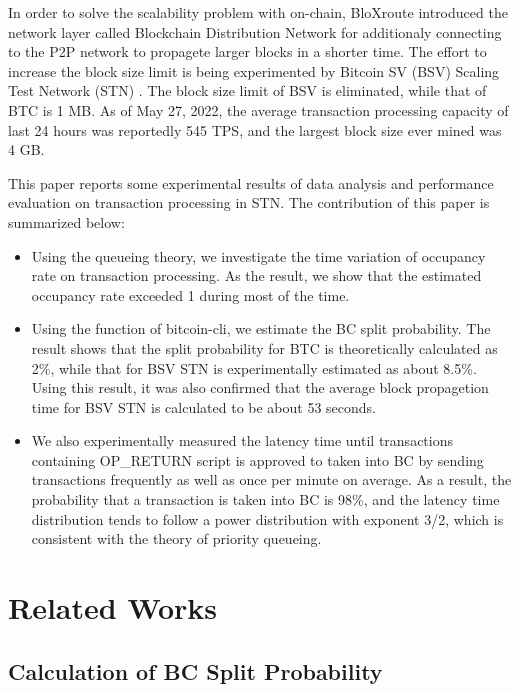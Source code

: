 \documentclass[graybox]{svmult}
\begin{document}
In order to solve the scalability problem with on-chain, 
BloXroute\cite{bloX} introduced the network layer called Blockchain Distribution Network for additionaly connecting to the P2P network to propagete larger blocks in a shorter time. 
The effort to increase the block size limit is being experimented by Bitcoin SV (BSV) \cite{bsv} Scaling Test Network (STN) \cite{bitcoinscaling}.
The block size limit of BSV is eliminated, while that of BTC is 1 MB. 
As of May 27, 2022, the average transaction processing capacity of last 24 hours was reportedly 545 TPS, and the largest block size ever mined was 4 GB. 


This paper reports some experimental results of data analysis and performance evaluation on transaction processing in STN. 
The contribution of this paper is summarized below: 
%
\begin{itemize}
  \item Using the queueing theory, we investigate the time variation of occupancy rate on transaction processing. 
	As the result, we show that the estimated occupancy rate exceeded 1 during most of the time. 
  \item Using the function of bitcoin-cli, we estimate the BC split probability. 
	The result shows that the split probability for BTC is theoretically calculated as 2\%, while that for BSV STN is experimentally estimated as about 8.5\%.
	Using this result, it was also confirmed that the average block propagetion time for BSV STN is calculated to be about 53 seconds. 
  \item We also experimentally measured the latency time until transactions containing OP\_RETURN script is approved to taken into BC by sending transactions frequently as well as once per minute on average. 
	As a result, the probability that a transaction is taken into BC is 98\%, and the latency time distribution tends to follow a power distribution with exponent 3/2, which is consistent with the theory of priority queueing. 
\end{itemize}
%




\section{Related Works}
\label{sec:rworks}

\subsection{Calculation of BC Split Probability}
\label{sec:fork}
\end{document}
